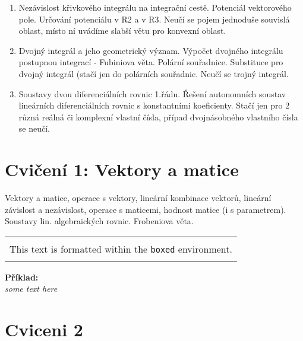 \documentclass{article}
\theoremstyle{definition}
\newenvironment{boxx}
    {\begin{center}
    \begin{tabular}{|p{0.9\textwidth}|}
    \hline\\
    }
    { 
    \\\\\hline
    \end{tabular} 
    \end{center}
    }
\newenvironment{colbox}[1]
  {\newcommand\colboxcolor{#1}%
   \begin{lrbox}{\selvestebox}%
   \begin{minipage}{\dimexpr\columnwidth-2\fboxsep\relax}}
  {\end{minipage}\end{lrbox}%
   \begin{center}
   \colorbox[HTML]{\colboxcolor}{\usebox{\selvestebox}}
   \end{center}}
\begin{document}
\begin{enumerate}
    \item Nezávislost křivkového integrálu na integrační cestě. Potenciál vektorového pole. Určování potenciálu v R2 a v R3. Neučí se pojem jednoduše souvislá oblast, místo ní uvádíme slabší větu pro konvexní oblast.
    \item Dvojný integrál a jeho geometrický význam. Výpočet dvojného integrálu postupnou integrací - Fubiniova věta. Polární souřadnice. Substituce pro dvojný integrál (stačí jen do polárních souřadnic. Neučí se trojný integrál.
    \item Soustavy dvou diferenciálních rovnic 1.řádu. Řešení autonomních soustav lineárních diferenciálních rovnic s konstantními koeficienty. Stačí jen pro 2 různá reálná či komplexní vlastní čísla, případ dvojnásobného vlastního čísla se neučí.
\end{enumerate}

\clearpage
\newpage
\section{Cvičení 1: Vektory a matice}
Vektory a matice, operace s vektory, lineární kombinace vektorů, lineární závislost a nezávislost, operace s maticemi, hodnost matice (i s parametrem). Soustavy lin. algebraických rovnic. Frobeniova věta.

\begin{boxx}
This text is formatted within the \texttt{boxed} environment.
\end{boxx}

\begin{colbox}{DDDDDD}
\textbf{Příklad: }\\ \textit{some text here}
\end{colbox}

\clearpage
\newpage
\section{Cviceni 2}

\clearpage
\newpage
\end{document}
